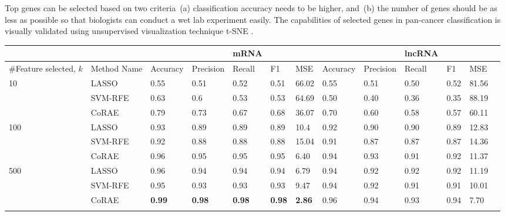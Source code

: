 \documentclass{bioinfo}
\begin{document}
Top genes can be selected based on two criteria~(a) classification accuracy needs to be higher,
and~(b) the number of genes should be as less as possible so that biologists can conduct a wet lab experiment
easily. The capabilities of selected genes in pan-cancer classification is visually validated using unsupervised visualization technique t-SNE \citep{maaten2008visualizing}.
\begin{table}[hbt]
{\begin{tabular}{@{}ll|lllll|llllll@{}}
\toprule
& & & &mRNA&&& & &lncRNA&&& \\
\midrule
\#Feature selected, $k$ & Method Name	&	Accuracy	&	Precision	&	Recall	&	F1	& MSE &	Accuracy	&	Precision	&	Recall	&	F1	& MSE	\\
\midrule
\multirow{3}{*}{10} &	LASSO	&	0.55	&	0.51	&	0.52	&	0.51	&	66.02	&	0.55	&	0.51	&	0.50	&	0.52	&	81.56	\\
&	SVM-RFE	&	0.63	&	0.6	&	0.53	&	0.53	&	64.69	&	0.50	&	0.40	&	0.36	&	0.35	&	88.19	\\
&	CoRAE	&	0.79	&	0.73	&	0.67	&	0.68	&	36.07	&	0.70	&	0.60	&	0.58	&	0.57	&	60.11	\\
\midrule


\multirow{3}{*}{100} &	LASSO	&	0.93	&	0.89	&	0.89	&	0.89	&	10.4	&	0.92	&	0.90	&	0.90	&	0.89	&	12.83	\\
&	SVM-RFE	&	0.92	&	0.88	&	0.88	&	0.88	&	15.04	&	0.91	&	0.87	&	0.87	&	0.87	&	14.36	\\
&	CoRAE	&	0.96	&	0.95	&	0.95	&	0.95	&	6.40	&	0.94	&	0.93	&	0.91	&	0.92	&	11.37	\\

\midrule

\multirow{3}{*}{500} &	LASSO	&	0.96	&	0.94	&	0.94	&	0.94	&	6.79	&	0.94	&	0.92	&	0.92	&	0.92	&	11.19	\\
&	SVM-RFE	&	0.95	&	0.93	&	0.93	&	0.93	&	9.47	&	0.94	&	0.92	&	0.91	&	0.91	&	10.01	\\
&	CoRAE	&	\textbf{0.99}	&	\textbf{0.98}	&	\textbf{0.98	}&	\textbf{0.98}	&	\textbf{2.86}	&	0.96	&	0.94	&	0.93	&	0.94	&	7.70	\\
\botrule
\end{tabular}}{}
\end{table}
\end{document}

